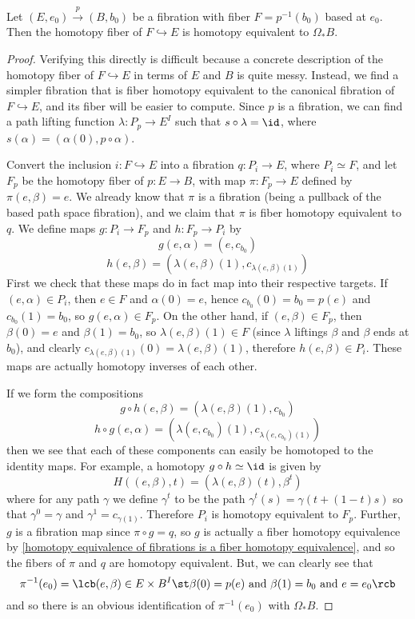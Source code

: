 \begin{prop}
\label{homotopy fiber of fiber inclusion}
Let $(E,e_0) \stackrel{p}{\rightarrow} (B,b_0)$ be a fibration with fiber $F=p^{-1}(b_0)$ based at $e_0$. Then the homotopy fiber of $F \hookrightarrow E$ is homotopy equivalent to $\Omega_* B$.
\end{prop}
\begin{proof}
Verifying this directly is difficult because a concrete description of the homotopy fiber of $F \hookrightarrow E$ in terms of $E$ and $B$ is quite messy. Instead, we find a simpler fibration that is fiber homotopy equivalent to the canonical fibration of $F \hookrightarrow E$, and its fiber will be easier to compute. Since $p$ is a fibration, we can find a path lifting function $\lambda : P_p \rightarrow E^I$ such that $s \circ \lambda = \id$, where $s(\alpha)=(\alpha(0),p \circ \alpha)$.

Convert the inclusion $i : F \hookrightarrow E$ into a fibration $q : P_i \rightarrow E$, where $P_i \simeq F$, and let $F_p$ be the homotopy fiber of $p : E \rightarrow B$, with map $\pi : F_p \rightarrow E$ defined by $\pi(e,\beta)=e$. We already know that $\pi$ is a fibration (being a pullback of the based path space fibration), and we claim that $\pi$ is fiber homotopy equivalent to $q$. We define maps $g : P_i \rightarrow F_p$ and $h : F_p \rightarrow P_i$ by
\[ g(e,\alpha) = (e,c_{b_0}) \]
\[ h(e,\beta) = \left( \lambda(e,\beta)(1), c_{\lambda(e,\beta)(1)} \right) \]
First we check that these maps do in fact map into their respective targets. If $(e,\alpha) \in P_i$, then $e \in F$ and $\alpha(0)=e$, hence $c_{b_0}(0)=b_0=p(e)$ and $c_{b_0}(1)=b_0$, so $g(e,\alpha) \in F_p$. On the other hand, if $(e,\beta) \in F_p$, then $\beta(0)=e$ and $\beta(1)=b_0$, so $\lambda(e,\beta)(1) \in F$ (since $\lambda$ liftings $\beta$ and $\beta$ ends at $b_0$), and clearly $c_{\lambda(e,\beta)(1)}(0) = \lambda(e,\beta)(1)$, therefore $h(e,\beta) \in P_i$. These maps are actually homotopy inverses of each other. 

If we form the compositions
\[ g \circ h(e,\beta) = \left( \lambda(e,\beta)(1), c_{b_0} \right) \]
\[ h \circ g(e,\alpha) = \left( \lambda(e,c_{b_0})(1), c_{\lambda(e,c_{b_0})(1)} \right) \]
then we see that each of these components can easily be homotoped to the identity maps. For example, a homotopy $g \circ h \simeq \id$ is given by
\[ H((e,\beta),t) = (\lambda(e,\beta)(t),\beta^t) \]
where for any path $\gamma$ we define $\gamma^t$ to be the path $\gamma^t(s)=\gamma(t+(1-t)s)$ so that $\gamma^0=\gamma$ and $\gamma^1=c_{\gamma(1)}$. Therefore $P_i$ is homotopy equivalent to $F_p$. Further, $g$ is a fibration map since $\pi \circ g = q$, so $g$ is actually a fiber homotopy equivalence by \cref{homotopy equivalence of fibrations is a fiber homotopy equivalence}, and so the fibers of $\pi$ and $q$ are homotopy equivalent. But, we can clearly see that
\[ \pi^{-1}(e_0) = \lcb (e,\beta) \in E \times B^I \st \beta(0) = p(e) \text{ and } \beta(1) = b_0 \text{ and } e = e_0 \rcb \]
and so there is an obvious identification of $\pi^{-1}(e_0)$ with $\Omega_* B$.
\end{proof}

